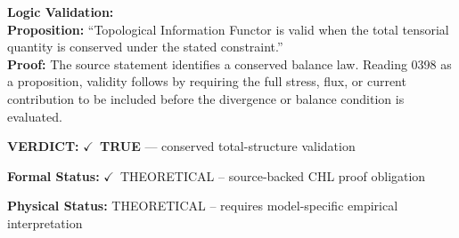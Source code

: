 \textbf{Logic Validation:}\\
\textbf{Proposition:} ``Topological Information Functor is valid when the total tensorial quantity is conserved
under the stated constraint.''\\
\textbf{Proof:} The source statement identifies a conserved balance law. Reading 0398 as a proposition,
validity follows by requiring the full stress, flux, or current contribution to be
included before the divergence or balance condition is evaluated.

\textbf{VERDICT:} \ensuremath{\checkmark}\ \textbf{TRUE} --- conserved total-structure validation

\textbf{Formal Status:} \ensuremath{\checkmark}\ THEORETICAL -- source-backed CHL proof obligation

\textbf{Physical Status:} THEORETICAL -- requires model-specific empirical interpretation
\par\vspace{0.45em}
\par
\ifTZPDarkEdition
{}
\fi
\endgroup
\endgroup
